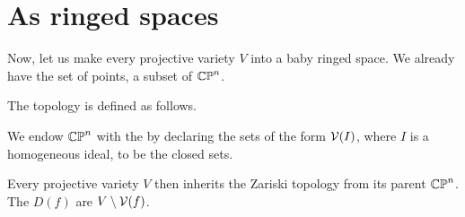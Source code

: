\documentclass[11pt]{scrreprt}
\begin{document}
\section{As ringed spaces}
Now, let us make every projective variety $V$ into a baby ringed space.
We already have the set of points, a subset of $\mathbb{CP}^n$.

The topology is defined as follows.
\begin{definition}
	We endow $\mathbb{CP}^n$ with the 
	by declaring the sets of the form $\mathcal V(I)$,
	where $I$ is a homogeneous ideal, to be the closed sets.
	
	Every projective variety $V$ then inherits the Zariski
	topology from its parent $\mathbb{CP}^n$.
	The  $D(f)$ are $V \setminus \mathcal V(f)$.
\end{definition}
\end{document}
